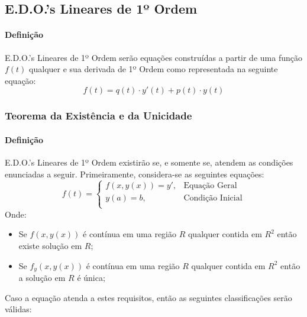 \documentclass{article}
\begin{document}
        \subsection{E.D.O.'s Lineares de 1º Ordem}
            \paragraph{Definição}E.D.O.'s Lineares de 1º Ordem serão equações construídas a partir de uma função $f(t)$ qualquer e sua derivada de 1º Ordem como representada na seguinte equação:
                \begin{equation}
                    \boxed{
                        f(t) = q(t) \cdot y'(t) + p(t) \cdot y(t)
                    }
                \end{equation}


            \subsubsection{Teorema da Existência e da Unicidade}
                \paragraph{Definição}E.D.O.'s Lineares de 1º Ordem existirão se, e somente se, atendem as condições enunciadas a seguir. Primeiramente, considera-se as seguintes equações:
                    \begin{equation}
                        f(t) =
                        \begin{cases}
                            f(x,y(x)) = y', & \text{Equação Geral}\\
                            y(a) = b,       & \text{Condição Inicial}\\
                        \end{cases}
                    \end{equation}
                Onde:
                    \begin{itemize}[noitemsep]
                        \item Se $f(x,y(x))$ é contínua em uma região $R$ qualquer contida em $R^2$ então existe solução em $R$;

                        \item Se $f_y(x,y(x))$ é contínua em uma região $R$ qualquer contida em $R^2$ então a solução em $R$ é única;
                    \end{itemize}
                Caso a equação atenda a estes requisitos, então as seguintes classificações serão válidas:
\end{document}
